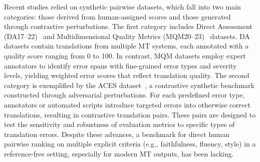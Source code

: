 \documentclass{article}
\theoremstyle{plain}
\theoremstyle{definition}
\theoremstyle{remark}
\newcommand{\tc}{\textcolor{red}{(\textit{cite})}} %
\begin{document}
Recent studies relied on synthetic pairwise datasets, which fall into two main categories: those derived from human-assigned scores and those generated through contrastive perturbations. The first category includes Direct Assessment (DA17–22)~\citep{Mathur2020ResultsOT} and Multidimensional Quality Metrics (MQM20–23)~\citep{Pal2023FindingsOT} datasets. DA datasets contain translations from multiple MT systems, each annotated with a quality score ranging from 0 to 100. In contrast, MQM datasets employ expert annotators to identify error spans with fine-grained error types and severity levels, yielding weighted error scores that reflect translation quality. The second category is exemplified by the ACES dataset~\citep{Amrhein2022ACESTA}, a contrastive synthetic benchmark constructed through adversarial perturbations. For each predefined error type, annotators or automated scripts introduce targeted errors into otherwise correct translations, resulting in contrastive translation pairs. These pairs are designed to test the sensitivity and robustness of evaluation metrics to specific types of translation errors.
Despite these advances, a benchmark for direct human pairwise ranking on multiple explicit criteria (e.g., faithfulness, fluency, style) in a reference-free setting, especially for modern MT outputs, has been lacking.



\end{document}
